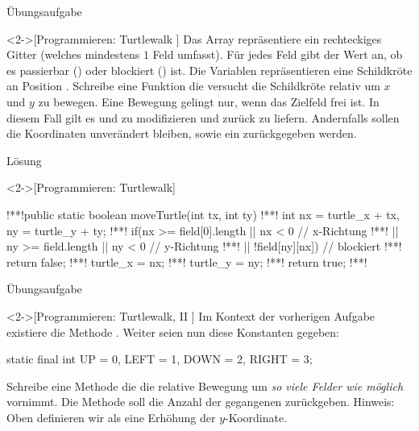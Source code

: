 \begin{frame}[c]{Übungsaufgabe}
    \begin{exercise}<2->[Programmieren: Turtlewalk ]
        \pause{}Das Array  repräsentiere ein rechteckiges Gitter (welches mindestens \(1\) Feld umfasst).\pause{} Für jedes Feld  gibt der Wert an, ob es passierbar () oder blockiert () ist.\pause{} Die Variablen \pause{} repräsentieren eine Schildkröte an Position .
        \pause{}Schreibe eine Funktion  die versucht die Schildkröte relativ um \(x\) und \(y\) zu bewegen.\pause{} Eine Bewegung gelingt nur, wenn das Zielfeld frei ist.\pause{} In diesem Fall gilt es  und  zu modifizieren und  zurück zu liefern.\pause{} Andernfalls sollen die Koordinaten unverändert bleiben, sowie ein  zurückgegeben werden.
    \end{exercise}
\end{frame}

\begin{frame}[c,fragile]{Lösung}
    \begin{solve}<2->[Programmieren: Turtlewalk]
        \begin{plainjava}
!**!public static boolean moveTurtle(int tx, int ty){
!**!    int nx = turtle_x + tx, ny = turtle_y + ty;
!**!    if(nx >= field[0].length || nx < 0 // x-Richtung
!**!       || ny >= field.length || ny < 0 // y-Richtung
!**!       || !field[ny][nx]) // blockiert
!**!            return false;
!**!    turtle_x = nx;
!**!    turtle_y = ny;
!**!    return true;
!**!}
        \end{plainjava}
    \end{solve}
\end{frame}

\begin{frame}[c,fragile]{Übungsaufgabe}
    \begin{exercise}<2->[Programmieren: Turtlewalk, II ]
        \pause{}Im Kontext der vorherigen Aufgabe existiere die Methode .\pause{} Weiter seien nun diese Konstanten gegeben:\pause{}
\begin{plainjava}
static final int UP = 0, LEFT = 1, DOWN = 2, RIGHT = 3;
\end{plainjava}
    \pause{}Schreibe eine Methode  die die relative Bewegung um \emph{so viele Felder wie möglich} vornimmt.\pause{} Die Methode soll die Anzahl der gegangenen zurückgeben.\pause{} Hinweis: Oben definieren wir als eine Erhöhung der \(y\)-Koordinate.
    \end{exercise}
\end{frame}

